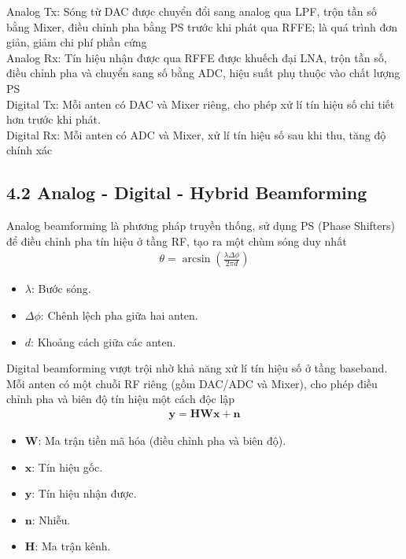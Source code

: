 \documentclass[a4paper,13pt]{article}
\begin{document}
Analog Tx: Sóng từ DAC được chuyển đổi sang analog qua LPF, trộn tần số bằng Mixer, điều chỉnh pha bằng PS trước khi phát qua RFFE; là quá trình đơn giản, giảm chi phí phần cứng \\

Analog Rx: Tín hiệu nhận được qua RFFE được khuếch đại LNA, trộn tần số, điều chỉnh pha và chuyển sang số bằng ADC, hiệu suất phụ thuộc vào chất lượng PS \\

Digital Tx: Mỗi anten có DAC và Mixer riêng, cho phép xử lí tín hiệu số chi tiết hơn trước khi phát. \\

Digital Rx: Mỗi anten có ADC và Mixer, xử lí tín hiệu số sau khi thu, tăng độ chính xác

\subsection{4.2 Analog - Digital - Hybrid Beamforming}
Analog beamforming là phương pháp truyền thống, sử dụng PS (Phase Shifters) để điều chỉnh pha tín hiệu ở tầng RF, tạo ra một chùm sóng duy nhất 
\begin{align}
\theta = \arcsin\left(\frac{\lambda \Delta \phi}{2\pi d}\right) \tag{5}
\end{align}

\begin{itemize}
    \item \(\lambda\): Bước sóng.
    \item \(\Delta \phi\): Chênh lệch pha giữa hai anten.
    \item \(d\): Khoảng cách giữa các anten.
\end{itemize}

Digital beamforming vượt trội nhờ khả năng xử lí tín hiệu số ở tầng baseband. Mỗi anten có một chuỗi RF riêng (gồm DAC/ADC và Mixer), cho phép điều chỉnh pha và biên độ tín hiệu một cách độc lập 
\begin{align}
\mathbf{y} = \mathbf{H} \mathbf{W} \mathbf{x} + \mathbf{n} \tag{6}
\end{align}
\begin{itemize}
    \item \(\mathbf{W}\): Ma trận tiền mã hóa (điều chỉnh pha và biên độ).
    \item \(\mathbf{x}\): Tín hiệu gốc.
    \item \(\mathbf{y}\): Tín hiệu nhận được.
    \item \(\mathbf{n}\): Nhiễu.
    \item \(\mathbf{H}\): Ma trận kênh.
\end{itemize}
\end{document}
